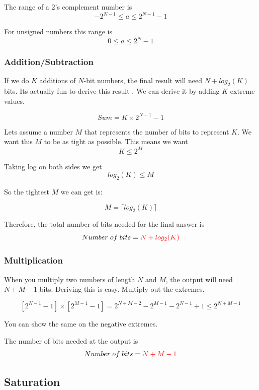 The range of a 2's complement number is
\[
-2^{N-1} \leq a \leq 2^{N-1}-1 
\]

For unsigned numbers this range is
\[
0 \leq a \leq 2^{N}-1 
\]

\subsubsection{Addition/Subtraction}

If we do $K$ additions of $N$-bit numbers, the final result will need $N + log_2(K)$ bits. Its actually fun to derive this result \cite{zipcpu_bitgrowth}. We can derive it by adding $K$ extreme values.

\begin{equation} \label{eq1}
		Sum = K \times 2^{N-1}-1
\end{equation}

Lets assume a number $M$ that represents the number of bits to represent $K$. We want this $M$ to be as tight as possible. This means we want
\[
	K \leq 2^M
\]

Taking log on both sides we get
\[
	log_2(K) \leq M 
\]

So the tightest $M$ we can get is: 

\[
	M = \lceil log_2(K) \rceil
\]

Therefore, the total number of bits needed for the final answer is 
\begin{equation}
	Number\; of \; bits = \textcolor{red}{N + log_2(K)}
\end{equation}

\subsubsection{Multiplication}

When you multiply two numbers of length $N$ and $M$, the output will need $N+M-1$ bits. Deriving this is easy. Multiply out the extremes. 

\[
[2^{N-1}-1] \times [2^{M-1}-1] = 2^{N+M-2} - 2^{M-1} - 2^{N-1} + 1 \leq 2^{N+M-1} 
\]

You can show the same on the negative extremes. 

The number of bits needed at the output is 
\begin{equation}
	Number \; of \; bits = \textcolor{red}{N+M-1}
\end{equation}


\subsection{Saturation \cite{ucdavis_sat}}

